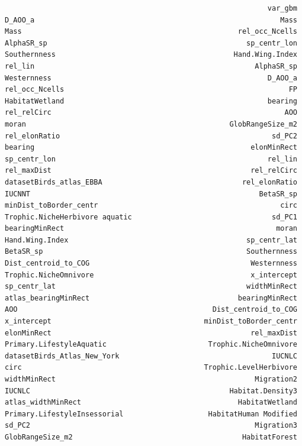 \documentclass[
  letterpaper,
  DIV=11,
  numbers=noendperiod]{scrreprt}
\begin{document}
\begin{verbatim}
                                                              var_gbm
D_AOO_a                                                          Mass
Mass                                                   rel_occ_Ncells
AlphaSR_sp                                               sp_centr_lon
Southernness                                          Hand.Wing.Index
rel_lin                                                    AlphaSR_sp
Westernness                                                   D_AOO_a
rel_occ_Ncells                                                     FP
HabitatWetland                                                bearing
rel_relCirc                                                       AOO
moran                                                GlobRangeSize_m2
rel_elonRatio                                                  sd_PC2
bearing                                                   elonMinRect
sp_centr_lon                                                  rel_lin
rel_maxDist                                               rel_relCirc
datasetBirds_atlas_EBBA                                 rel_elonRatio
IUCNNT                                                      BetaSR_sp
minDist_toBorder_centr                                           circ
Trophic.NicheHerbivore aquatic                                 sd_PC1
bearingMinRect                                                  moran
Hand.Wing.Index                                          sp_centr_lat
BetaSR_sp                                                Southernness
Dist_centroid_to_COG                                      Westernness
Trophic.NicheOmnivore                                     x_intercept
sp_centr_lat                                             widthMinRect
atlas_bearingMinRect                                   bearingMinRect
AOO                                              Dist_centroid_to_COG
x_intercept                                    minDist_toBorder_centr
elonMinRect                                               rel_maxDist
Primary.LifestyleAquatic                        Trophic.NicheOmnivore
datasetBirds_Atlas_New_York                                    IUCNLC
circ                                           Trophic.LevelHerbivore
widthMinRect                                               Migration2
IUCNLC                                               Habitat.Density3
atlas_widthMinRect                                     HabitatWetland
Primary.LifestyleInsessorial                    HabitatHuman Modified
sd_PC2                                                     Migration3
GlobRangeSize_m2                                        HabitatForest

\end{verbatim}
\end{document}
